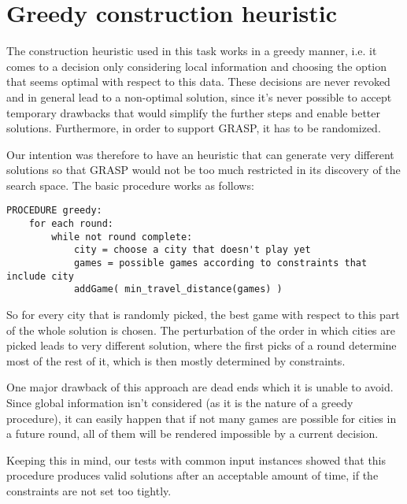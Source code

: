 \section{Greedy construction heuristic}
\label{sec:greedy}

The construction heuristic used in this task works in a greedy manner, i.e. it comes to a decision only considering local information and choosing the option that seems optimal with respect to this data. These decisions are never revoked and in general lead to a non-optimal solution, since it's never possible to accept temporary drawbacks that would simplify the further steps and enable better solutions. Furthermore, in order to support GRASP, it has to be randomized.

Our intention was therefore to have an heuristic that can generate very different solutions so that GRASP would not be too much restricted in its discovery of the search space. The basic procedure works as follows:

\begin{lstlisting}
PROCEDURE greedy:
	for each round:
		while not round complete:
			city = choose a city that doesn't play yet
			games = possible games according to constraints that include city
			addGame( min_travel_distance(games) )
\end{lstlisting}

So for every city that is randomly picked, the best game with respect to this part of the whole solution is chosen. The perturbation of the order in which cities are picked leads to very different solution, where the first picks of a round determine most of the rest of it, which is then mostly determined by constraints.

One major drawback of this approach are dead ends which it is unable to avoid. Since global information isn't considered (as it is the nature of a greedy procedure), it can easily happen that if not many games are possible for cities in a future round, all of them will be rendered impossible by a current decision.

Keeping this in mind, our tests with common input instances showed that this procedure produces valid solutions after an acceptable amount of time, if the constraints are not set too tightly. 
